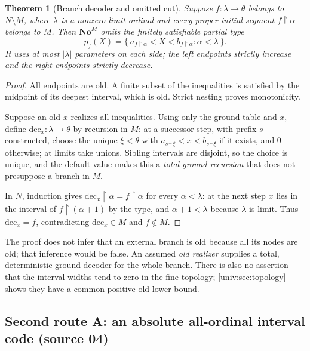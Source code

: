 \documentclass[11pt,letterpaper]{article}
\numberwithin{equation}{section}
\newtheorem{theorem}{Theorem}[section]
\theoremstyle{definition}
\theoremstyle{remark}
\newcommand{\No}{\mathbf{No}}
\newcommand{\NoM}{\No^{M}}
\newcommand{\res}{\mathbin{\upharpoonright}}
\newcommand{\abs}[1]{\lvert#1\rvert}
\begin{document}
\begin{theorem}[Branch decoder and omitted cut]\label{univ:thm:decode}
Suppose $f:\lambda\to\theta$ belongs to $N\setminus M$, where $\lambda$ is a
nonzero limit ordinal and every proper initial segment $f\res\alpha$ belongs
to $M$. Then $\NoM$ omits the finitely satisfiable partial type
\begin{equation}\label{univ:eq:branchtype}
 p_f(X)=\{\ a_{f\res\alpha}<X<b_{f\res\alpha}:\alpha<\lambda\ \}.
\end{equation}
It uses at most $\abs\lambda$ parameters on each side; the left endpoints
strictly increase and the right endpoints strictly decrease.
\end{theorem}
\begin{proof}
All endpoints are old. A finite subset of the inequalities is satisfied by
the midpoint of its deepest interval, which is old. Strict nesting proves
monotonicity.

Suppose an old $x$ realizes all inequalities. Using only the ground table and
$x$, define $\mathrm{dec}_x:\lambda\to\theta$ by recursion in $M$: at a successor step,
with prefix $s$ constructed, choose the unique $\xi<\theta$ with
$a_{s^\frown\xi}<x<b_{s^\frown\xi}$ if it exists, and $0$ otherwise; at limits
take unions. Sibling intervals are disjoint, so the choice is unique, and the
default value makes this a \emph{total ground recursion} that does not
presuppose a branch in $M$.

In $N$, induction gives $\mathrm{dec}_x\res\alpha=f\res\alpha$ for every $\alpha<\lambda$:
at the next step $x$ lies in the interval of $f\res(\alpha+1)$ by the type, and
$\alpha+1<\lambda$ because $\lambda$ is limit. Thus $\mathrm{dec}_x=f$, contradicting
$\mathrm{dec}_x\in M$ and $f\notin M$.
\end{proof}

The proof does not infer that an external branch is old because all its nodes
are old; that inference would be false. An assumed \emph{old realizer}
supplies a total, deterministic ground decoder for the whole branch. There is
also no assertion that the interval widths tend to zero in the fine topology;
\cref{univ:sec:topology} shows they have a common positive old lower bound.

\subsection{Second route A: an absolute all-ordinal interval code (source 04)}\label{univ:sub:absolutecode}
\end{document}
